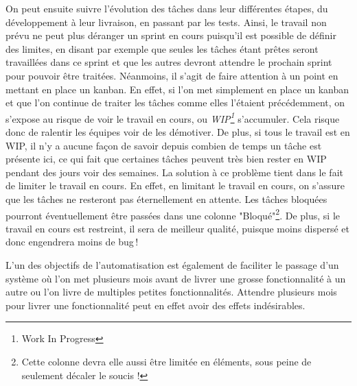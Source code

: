 On peut ensuite suivre l'évolution des tâches dans leur différentes étapes, du développement à leur livraison, en passant par les tests. Ainsi, le travail non prévu ne peut plus déranger un sprint en cours puisqu'il est possible de définir des limites, en disant par exemple que seules les tâches étant prêtes seront travaillées dans ce sprint et que les autres devront attendre le prochain sprint pour pouvoir être traitées. Néanmoins, il s'agit de faire attention à un point en mettant en place un kanban. En effet, si l'on met simplement en place un kanban et que l'on continue de traiter les tâches comme elles l'étaient précédemment, on s'expose au risque de voir le travail en cours, ou \emph{WIP\footnote{Work In Progress}} s'accumuler. Cela risque donc de ralentir les équipes voir de les démotiver. De plus, si tous le travail est en WIP, il n'y a aucune façon de savoir depuis combien de temps un tâche est présente ici, ce qui fait que certaines tâches peuvent très bien rester en WIP pendant des jours voir des semaines. La solution à ce problème tient dans le fait de limiter le travail en cours. En effet, en limitant le travail en cours, on s'assure que les tâches ne resteront pas éternellement en attente. Les tâches bloquées pourront éventuellement être passées dans une colonne "Bloqué"\footnote{Cette colonne devra elle aussi être limitée en éléments, sous peine de seulement décaler le soucis !}. De plus, si le travail en cours est restreint, il sera de meilleur qualité, puisque moins dispersé et donc engendrera moins de bug !

L'un des objectifs de l'automatisation est également de faciliter le passage d'un système où l'on met plusieurs mois avant de livrer une grosse fonctionnalité à un autre ou l'on livre de multiples petites fonctionnalités. Attendre plusieurs mois pour livrer une fonctionnalité peut en effet avoir des effets indésirables.

